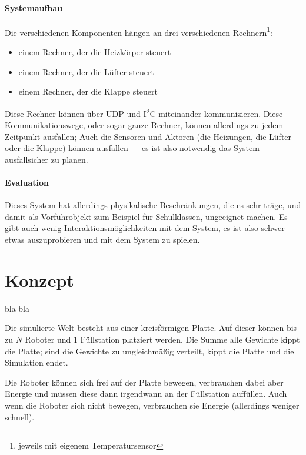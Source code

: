 \documentclass[
    12pt,
    bibliography=totoc,
    ngerman,
    enabledeprecatedfontcommands
]{scrartcl}
\begin{document}
\paragraph{Systemaufbau} Die verschiedenen Komponenten h{\"{a}}ngen an drei verschiedenen Rechnern\footnote{jeweils mit eigenem Temperatursensor}:
\begin{itemize}
\item einem Rechner, der die Heizk{\"{o}}rper steuert
\item einem Rechner, der die L{\"{u}}fter steuert
\item einem Rechner, der die Klappe steuert
\end{itemize}

Diese Rechner k{\"{o}}nnen {\"{u}}ber UDP und I\textsuperscript{2}C miteinander kommunizieren. Diese Kommunikationswege, oder sogar ganze Rechner, k{\"{o}}nnen
allerdings zu jedem Zeitpunkt ausfallen; Auch die Sensoren und Aktoren (die Heizungen, die L{\"{u}}fter oder die Klappe) k{\"{o}}nnen ausfallen --- es ist also notwendig das System ausfallsicher zu planen.


\paragraph{Evaluation} Dieses System hat allerdings physikalische Beschr{\"{a}}nkungen, die es sehr
tr{\"{a}}ge, und damit als Vorf{\"{u}}hrobjekt zum Beispiel f{\"{u}}r Schulklassen,
ungeeignet machen. Es gibt auch wenig Interaktionsm{\"{o}}glichkeiten mit dem System, es ist also schwer etwas auszuprobieren und
mit dem System zu spielen.

\clearpage
\section{Konzept}
bla bla\todo{}

Die simulierte Welt besteht aus einer kreisf{\"{o}}rmigen Platte. Auf dieser k{\"{o}}nnen bis zu $N$ Roboter und $1$ F{\"{u}}llstation
platziert werden. Die Summe alle Gewichte kippt die Platte; sind die Gewichte zu ungleichm{\"{a}}{\ss}ig verteilt, kippt
die Platte und die Simulation endet.

Die Roboter k{\"{o}}nnen sich frei auf der Platte bewegen, verbrauchen dabei aber Energie und m{\"{u}}ssen diese dann irgendwann
an der F{\"{u}}llstation auff{\"{u}}llen. Auch wenn die Roboter sich nicht bewegen, verbrauchen sie Energie (allerdings weniger
schnell).
\end{document}
